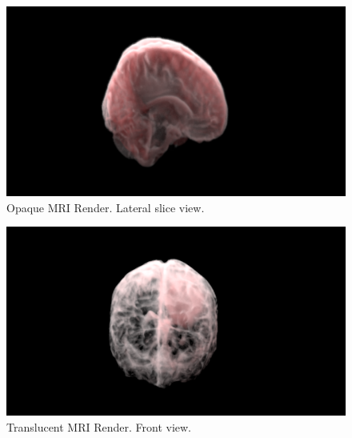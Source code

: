 \begin{figure}[h]
 \centering %
 \includegraphics[width=\columnwidth]{pictures/bt-noalphared-lateral-slice.png}
 \caption{Opaque MRI Render. Lateral slice view.}
 \label{fig:noalphared-lateral-slice}
\end{figure}

\begin{figure}[h]
 \centering %
 \includegraphics[width=\columnwidth]{pictures/bt-alphared-front.png}
 \caption{Translucent MRI Render. Front view.}
 \label{fig:alphared-front}
\end{figure}

